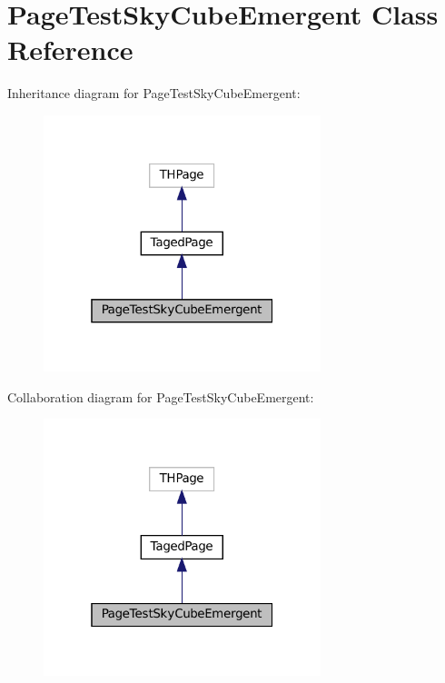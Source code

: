 \hypertarget{class_page_test_sky_cube_emergent}{}\section{Page\+Test\+Sky\+Cube\+Emergent Class Reference}
\label{class_page_test_sky_cube_emergent}


Inheritance diagram for Page\+Test\+Sky\+Cube\+Emergent\+:\nopagebreak
\begin{figure}[H]
\begin{center}
\leavevmode
\includegraphics[width=229pt]{class_page_test_sky_cube_emergent__inherit__graph}
\end{center}
\end{figure}


Collaboration diagram for Page\+Test\+Sky\+Cube\+Emergent\+:\nopagebreak
\begin{figure}[H]
\begin{center}
\leavevmode
\includegraphics[width=229pt]{class_page_test_sky_cube_emergent__coll__graph}
\end{center}
\end{figure}
